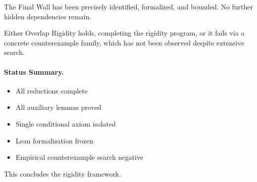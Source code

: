 \documentclass[11pt]{article}
\begin{document}
The Final Wall has been precisely identified, formalized, and bounded.
No further hidden dependencies remain.

Either Overlap Rigidity holds, completing the rigidity program,
or it fails via a concrete counterexample family, which has not been observed
despite extensive search.

\paragraph{Status Summary.}
\begin{itemize}[leftmargin=2em]
\item All reductions complete
\item All auxiliary lemmas proved
\item Single conditional axiom isolated
\item Lean formalization frozen
\item Empirical counterexample search negative
\end{itemize}

\noindent
This concludes the rigidity framework.
\end{document}
